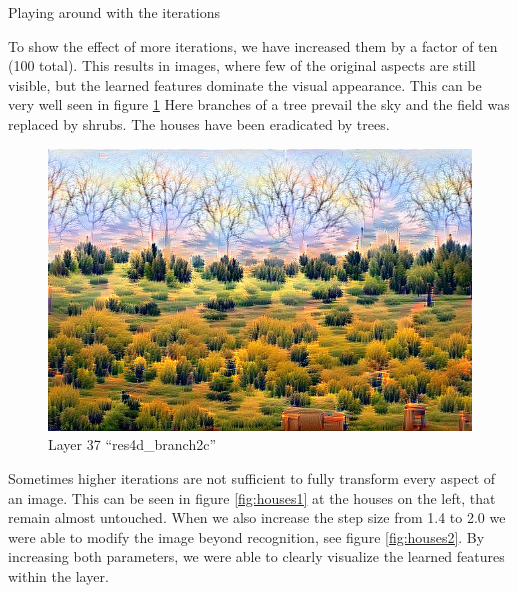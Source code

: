 Playing around with the iterations

To show the effect of more iterations, we have increased them by a factor of ten (100 total).
This results in images, where few of the original aspects are still visible, but the learned features dominate the visual appearance.
This can be very well seen in figure \ref{fig:baum}
Here branches of a tree prevail the sky and the field was replaced by shrubs.
The houses have been eradicated by trees.

\begin{figure}[H]
	\centering
	\includegraphics[width=0.7\linewidth]{img/baum}
	\caption{Layer 37 \enquote{res4d\_branch2c}}
	\label{fig:baum}
\end{figure}

Sometimes higher iterations are not sufficient to fully transform every aspect of an image.
This can be seen in figure \ref{fig:houses1} at the houses on the left, that remain almost untouched.
When we also increase the step size from 1.4 to 2.0 we were able to modify the image beyond recognition, see figure \ref{fig:houses2}.
By increasing both parameters, we were able to clearly visualize the learned features within the layer.


